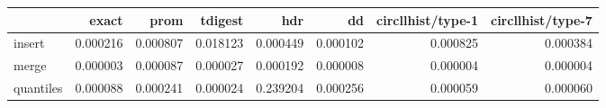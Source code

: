 \begin{tabular}{lrrrrrrr}
\toprule
{} &     exact &      prom &   tdigest &       hdr &        dd &  circllhist/type-1 &  circllhist/type-7 \\
\midrule
insert    &  0.000216 &  0.000807 &  0.018123 &  0.000449 &  0.000102 &           0.000825 &           0.000384 \\
merge     &  0.000003 &  0.000087 &  0.000027 &  0.000192 &  0.000008 &           0.000004 &           0.000004 \\
quantiles &  0.000088 &  0.000241 &  0.000024 &  0.239204 &  0.000256 &           0.000059 &           0.000060 \\
\bottomrule
\end{tabular}
